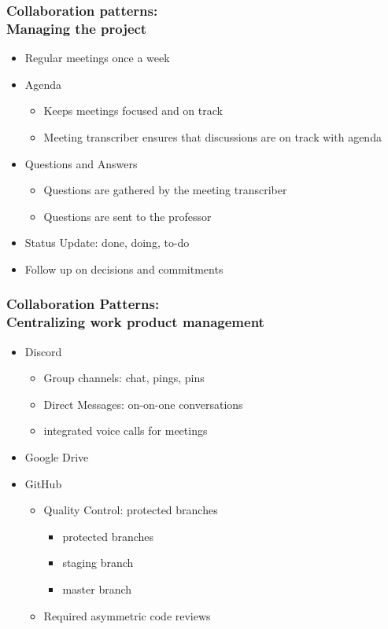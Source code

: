 \documentclass{beamer}
\begin{document}
  \begin{frame}
  \frametitle{Collaboration patterns:\\ Managing the project}
  \begin{itemize}
   \item Regular meetings once a week
   \item Agenda
     \begin{itemize}
     \item Keeps meetings focused and on track
     \item Meeting transcriber ensures that discussions are on track with agenda
     \end{itemize}
   \item Questions and Answers
      \begin{itemize}
     \item Questions are gathered by the meeting transcriber
     \item Questions are sent to the professor
     \end{itemize}
   \item Status Update: done, doing, to-do
   \item Follow up on decisions and commitments
  \end{itemize}
  \end{frame}

  \begin{frame}
  \frametitle{Collaboration Patterns: \\ Centralizing work product management}
  \begin{itemize}
   \item Discord
    \begin{itemize}
     \item Group channels: chat, pings, pins
     \item Direct Messages: on-on-one conversations
     \item integrated voice calls for meetings
    \end{itemize}
   \item Google Drive
   \item GitHub
    \begin{itemize}
     \item Quality Control: protected branches
       \begin{itemize}
          \item protected branches
          \item staging branch
          \item master branch
      \end{itemize}
     \item Required asymmetric code reviews
    \end{itemize}
  \end{itemize}
  \end{frame}
\end{document}
